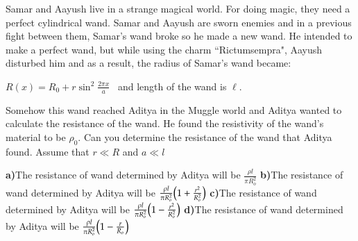 \documentclass[11pt,a4paper,fleqn]{scrartcl}
\begin{document}
\begin{problem}

Samar and Aayush live in a strange magical world. For doing magic, they need a perfect cylindrical wand. Samar and Aayush are sworn enemies and in a previous fight between them, Samar's wand broke so he made a new wand. He intended to make a perfect wand, but while using the charm ``Rictumsempra", Aayush disturbed him and as a result, the radius of Samar's wand became:

$R(x)=R_0+r\sin^2 \frac{2 \pi x}{a}$ \ and length of the wand is $\ell$.

Somehow this wand reached Aditya in the Muggle world and Aditya wanted to calculate the resistance of the wand. He found the resistivity of the wand's material to be $\rho_0$. Can you determine the resistance of the wand that Aditya found. 
Assume that $r\ll R$ and $a\ll l$
\vspace{5mm}

\textbf{a)}The resistance of wand determined by Aditya will be $\frac{\rho l}{\pi R_o^2}$ \newline 
\textbf{b)}The resistance of wand determined by Aditya will be $\frac{\rho l}{\pi R_o^2}\qty(1+\frac{r^2}{R_o^2})$ 
\newline \textbf{c)}The resistance of wand determined by Aditya will be $\frac{\rho l}{\pi R_o^2}\qty(1-\frac{r^2}{R_o^2})$ 
\newline \textbf{d)}The resistance of wand determined by Aditya will be $\frac{\rho l}{\pi R_o^2}\qty(1-\frac{r}{R_o})$
\vspace{10mm}
\begin{center}
    


\begin{tikzpicture}[x=0.75pt,y=0.75pt,yscale=-1,xscale=1]


\end{tikzpicture}
\end{center}
\end{problem}
\end{document}
